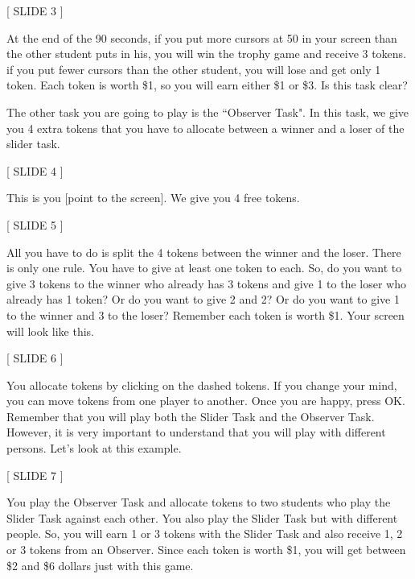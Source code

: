 \documentclass[11pt]{article}
\begin{document}
{\centerline{[ SLIDE 3 ] } \par \medskip

\noindent At the end of the 90 seconds, if you put more cursors at 50 in your screen than the other student puts in his, you will win the trophy game and receive 3 tokens. if you put fewer cursors than the other student, you will lose and get only 1 token. Each token is worth \$1, so you will earn either \$1 or \$3. Is this task clear? \par \medskip

\noindent The other task you are going to play is the ``Observer Task". In this task, we give you 4 extra tokens that you have to allocate between a winner and a loser of the slider task. \par \medskip

\centerline{[ SLIDE 4 ] } \par \medskip

\noindent This is you [point to the screen]. We give you 4 free tokens. \par \medskip

\centerline{[ SLIDE 5 ] } \par \medskip

\noindent All you have to do is split the 4 tokens between the winner and the loser. There is only one rule. You have to give at least one token to each. So, do you want to give 3 tokens to the winner who already has 3 tokens and give 1 to the loser who already has 1 token? Or do you want to give 2 and 2? Or do you want to give 1 to the winner and 3 to the loser? Remember each token is worth \$1. Your screen will look like this.

\centerline{[ SLIDE 6 ] } \par \medskip

\noindent You allocate tokens by clicking on the dashed tokens. If you change your mind, you can move tokens from one player to another. Once you are happy, press OK. Remember that you will play both the Slider Task and the Observer Task. However, it is very important to understand that you will play with different persons. Let's look at this example. \par \medskip

\centerline{[ SLIDE 7 ] } \par \medskip

\noindent You play the Observer Task and allocate tokens to two students who play the Slider Task against each other.  You also play the Slider Task but with different people. So, you will earn 1 or 3 tokens with the Slider Task and also receive 1, 2 or 3 tokens from an Observer. Since each token is worth \$1, you will get between \$2 and \$6 dollars just with this game. \par \medskip

}
\end{document}
